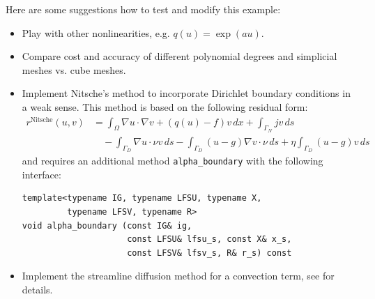 \documentclass[a4paper,12pt]{article}
\begin{document}
Here are some suggestions how to test and modify this example:
\begin{itemize}
\item Play with other nonlinearities, e.g. $q(u)=\exp(au)$.
\item Compare cost and accuracy of different polynomial degrees and
simplicial meshes vs. cube meshes.
\item Implement Nitsche's method to incorporate Dirichlet boundary conditions 
in a weak sense. This method is based on the following residual form:
\begin{equation*}
\begin{split}
r^{\text{Nitsche}}(u,v) &= \int_\Omega \nabla u \cdot \nabla v + (q(u)-f)v\,dx + \int_{\Gamma_N} jv\,ds \\
&\quad - \int_{\Gamma_D} \nabla u \cdot\nu v\,ds - \int_{\Gamma_D} (u-g)\nabla v \cdot\nu\,ds 
+ \eta \int_{\Gamma_D} (u-g)v\,ds
\end{split}
\end{equation*}
and requires an additional method \lstinline{alpha_boundary} with the following interface:
\begin{lstlisting}[basicstyle=\ttfamily\small,
frame=single,
backgroundcolor=\color{listingbg}]
template<typename IG, typename LFSU, typename X, 
         typename LFSV, typename R>
void alpha_boundary (const IG& ig,
                     const LFSU& lfsu_s, const X& x_s, 
                     const LFSV& lfsv_s, R& r_s) const
\end{lstlisting}

\item Implement the streamline diffusion method for a convection term, see \cite{Elman2005} for details.
\end{itemize}



\end{document}
